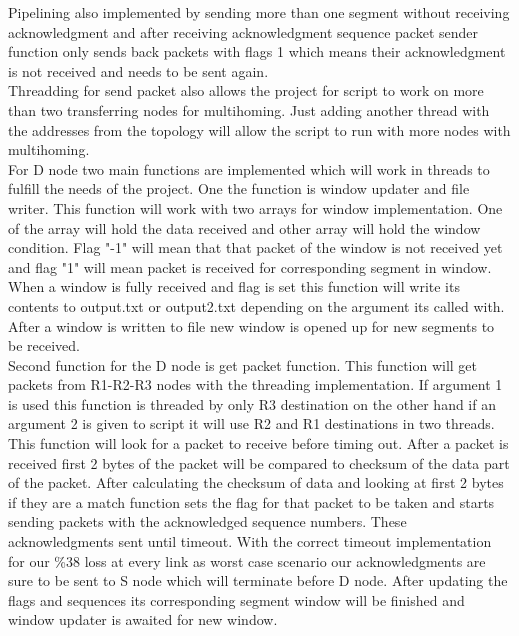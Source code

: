 \documentclass[conference]{IEEEtran}
\begin{document}
Pipelining also implemented by sending more than one segment without receiving acknowledgment and after receiving acknowledgment sequence packet sender function only sends back packets with flags 1 which means their acknowledgment is not received and needs to be sent again. \\

Threadding for send packet also allows the project for script to work on more than two transferring nodes for multihoming. Just adding another thread with the addresses from the topology will allow the script to run with more nodes with  multihoming.\\

For D node two main functions are implemented which will work in threads to fulfill the needs of the project. One the function is window updater and file writer. This function will work with two arrays for window implementation. One of the array will hold the data received and other array will hold the window condition. Flag "-1" will mean that that packet of the window is not received yet and flag "1" will mean packet is received for corresponding segment in window. When a window is fully received and flag is set this function will write its contents to output.txt or output2.txt depending on the argument its called with. After a window is written to file new window is opened up for new segments to be received.  \\

Second function for the D node is get packet function. This function will get packets from R1-R2-R3 nodes with the threading implementation. If argument 1 is used this function is threaded by only R3 destination on the other hand if an argument 2 is given to script it will use R2 and R1 destinations in two threads. This function will look for a packet to receive before timing out. After a packet is received first 2 bytes of the packet will be compared to checksum of the data part of the packet. After calculating the checksum of data and looking at first 2 bytes if they are a match function sets the flag for that packet to be taken and starts sending packets with the acknowledged sequence numbers. These acknowledgments sent until timeout. With the correct timeout implementation for our \%38 loss at every link as worst case scenario our acknowledgments are sure to be sent to S node which will terminate before D node. After updating the flags and sequences its corresponding segment window will be finished and window updater is awaited for new window.\\
\end{document}
